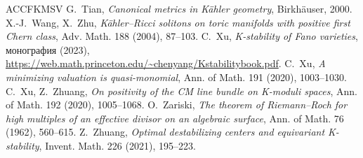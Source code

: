 \documentclass[11pt,a4paper]{article}
\theoremstyle{plain}
\theoremstyle{definition}
\theoremstyle{remark}
\begin{document}
\begin{thebibliography}{ACCFKMSV}
 G.~Tian, \emph{Canonical metrics in K\"ahler geometry}, Birkh\"auser, 2000.
 X.-J.~Wang, X.~Zhu, \emph{K\"ahler--Ricci solitons on toric manifolds with positive first Chern class}, Adv. Math. 188 (2004), 87--103.
 C.~Xu, \emph{K-stability of Fano varieties}, монография (2023), \url{https://web.math.princeton.edu/~chenyang/Kstabilitybook.pdf}.
 C.~Xu, \emph{A minimizing valuation is quasi-monomial}, Ann. of Math. 191 (2020), 1003--1030.
 C.~Xu, Z.~Zhuang, \emph{On positivity of the CM line bundle on K-moduli spaces}, Ann. of Math. 192 (2020), 1005--1068.
 O.~Zariski, \emph{The theorem of Riemann--Roch for high multiples of an effective divisor on an algebraic surface}, Ann. of Math. 76 (1962), 560--615.
 Z.~Zhuang, \emph{Optimal destabilizing centers and equivariant K-stability}, Invent. Math. 226 (2021), 195--223.
\end{thebibliography}
\end{document}

